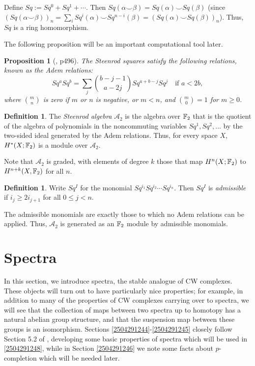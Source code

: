 \documentclass[11pt, titlepage]{article} %
\def\bb{\ensuremath\mathbb}
\def\A{\ensuremath{\mathscr{A}_2}}
\numberwithin{equation}{subsection}
\theoremstyle{plain}
\newtheorem{proposition}[theorem]{Proposition}
\theoremstyle{definition}
\newtheorem{definition}[theorem]{Definition}
\begin{document}
Define \(Sq:=Sq^0+Sq^1+\cdots\). Then \(Sq(\alpha\smile \beta)=Sq(\alpha)\smile Sq(\beta)\) (since \((Sq(\alpha\smile \beta))_n=\sum_iSq^i(\alpha)\smile Sq^{n-i}(\beta)=(Sq(\alpha)\smile Sq(\beta))_n\)). Thus, \(Sq\) is a ring homomorphism. 

The following proposition will be an important computational tool later. 

\begin{proposition}[{\autocite{hatcher}, p496}]\label{2504291153}
The Steenrod squares satisfy the following relations, known as the \textit{Adem relations}:
\[Sq^aSq^b=\sum_j {b-j-1\choose a-2j}Sq^{a+b-j}Sq^j \quad \text{if } a<2b,\]
where \({m \choose n}\) is zero if \(m\) or \(n\) is negative, or \(m<n\), and \({m \choose 0}=1\) for \(m \geq 0\).
\end{proposition}

\begin{definition}
The \textit{Steenrod algebra} \(\mathscr{A}_2\) is the algebra over \(\bb{F}_2\) that is the quotient of the algebra of polynomials in the noncommuting variables \(Sq^1, Sq^2, ...\) by the two-sided ideal generated by the Adem relations. Thus, for every space \(X\), \(H^*(X; \bb{F}_2)\) is a module over \(\mathscr A_2\).
\end{definition}

Note that \(\mathscr A_2\) is graded, with elements of degree \(k\) those that map \(H^n(X; \bb{F}_2)\) to \(H^{n+k}(X, \bb{F}_2)\) for all \(n\). 

\begin{definition}
Write \(Sq^I\) for the monomial \(Sq^{i_1}Sq^{i_2}\cdots Sq^{i_n}\). Then \(Sq^I\) is \textit{admissible} if \(i_j\geq 2i_{j+1}\) for all \(0\leq j < n\). 
\end{definition}

The admissible monomials are exactly those to which no Adem relations can be applied. Thus, \(\A\) is generated as an \(\bb{F}_2\) module by admissible monomials. 

\section{Spectra}

In this section, we introduce spectra, the stable analogue of CW complexes. These objects will turn out to have particularly nice properties; for example, in addition to many of the properties of CW complexes carrying over to spectra, we will see that the collection of maps between two spectra up to homotopy has a natural abelian group structure, and that the suspension map between these groups is an isomorphism. Sections \ref{2504291244}-\ref{2504291245} closely follow Section 5.2 of \autocite{hatcher5}, developing some basic properties of spectra which will be used in \ref{2504291248}, while in Section \ref{2504291246} we note some facts about \(p\)-completion which will be needed later. 
\end{document}
